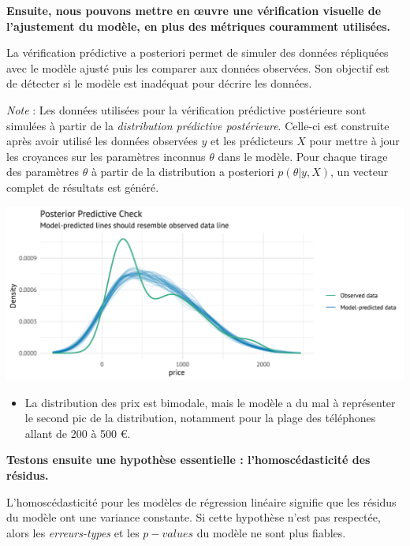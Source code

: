 \documentclass[
  12pt,
]{report}
\providecommand{\tightlist}{%
  \setlength{\itemsep}{0pt}\setlength{\parskip}{0pt}}\usepackage{longtable,booktabs,array}
\begin{document}
\newpage

\textbf{Ensuite, nous pouvons mettre en œuvre une vérification visuelle
de l'ajustement du modèle, en plus des métriques couramment utilisées.}

La vérification prédictive a posteriori permet de simuler des données
répliquées avec le modèle ajusté puis les comparer aux données
observées. Son objectif est de détecter si le modèle est inadéquat pour
décrire les données.

\emph{Note} : Les données utilisées pour la vérification prédictive
postérieure sont simulées à partir de la \emph{distribution prédictive
postérieure}. Celle-ci est construite après avoir utilisé les données
observées \(y\) et les prédicteurs \(X\) pour mettre à jour les
croyances sur les paramètres inconnus \(\theta\) dans le modèle. Pour
chaque tirage des paramètres \(\theta\) à partir de la distribution a
posteriori \(p(\theta|y,X)\), un vecteur complet de résultats est
généré.

\begin{center}
\includegraphics{report_files/figure-pdf/posterior_level-1.pdf}
\end{center}

\begin{itemize}
\tightlist
\item
  La distribution des prix est bimodale, mais le modèle a du mal à
  représenter le second pic de la distribution, notamment pour la plage
  des téléphones allant de 200 à 500 €.
\end{itemize}

\textbf{Testons ensuite une hypothèse essentielle : l'homoscédasticité
des résidus.}

L'homoscédasticité pour les modèles de régression linéaire signifie que
les résidus du modèle ont une variance constante. Si cette hypothèse
n'est pas respectée, alors les \emph{erreurs-types} et les \(p-values\)
du modèle ne sont plus fiables.
\end{document}
